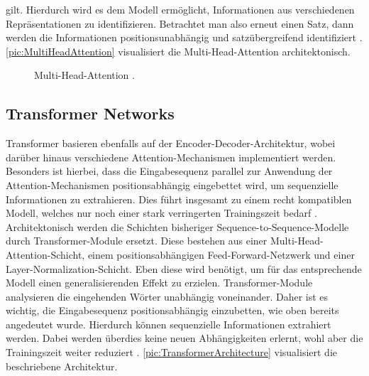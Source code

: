 \noindent
gilt. Hierdurch wird es dem Modell ermöglicht, Informationen aus verschiedenen Repräsentationen zu identifizieren. Betrachtet man also erneut einen Satz, dann werden die Informationen positionsunabhängig und satzübergreifend identifiziert \cite{VAS17}. \autoref{pic:MultiHeadAttention} visualisiert die Multi-Head-Attention architektonisch.
\newpage

\begin{figure}[h!]
  \centering
  \caption{Multi-Head-Attention \cite[S.~400]{ZHA20}.}
  \label{pic:MultiHeadAttention}
\end{figure}


\subsection{Transformer Networks}
\noindent
Transformer basieren ebenfalls auf der Encoder-Decoder-Architektur, wobei darüber hinaus verschiedene Attention-Mechanismen implementiert werden. Besonders ist hierbei, dass die Eingabesequenz parallel zur Anwendung der Attention-Mechanismen positionsabhängig eingebettet wird, um sequenzielle Informationen zu extrahieren. Dies führt insgesamt zu einem recht kompatiblen Modell, welches nur noch einer stark verringerten Trainingszeit bedarf \cite[S.~5-6]{VAS17}.\\

\noindent
Architektonisch werden die Schichten bisheriger Sequence-to-Sequence-Modelle durch Transformer-Module ersetzt. Diese bestehen aus einer Multi-Head-Attention-Schicht, einem positionsabhängigen Feed-Forward-Netzwerk und einer Layer-Normalization-Schicht. Eben diese wird benötigt, um für das entsprechende Modell einen generalisierenden Effekt zu erzielen. Transformer-Module analysieren die eingehenden Wörter unabhängig voneinander. Daher ist es wichtig, die Eingabesequenz positionsabhängig einzubetten, wie oben bereits angedeutet wurde. Hierdurch können sequenzielle Informationen extrahiert werden. Dabei werden überdies keine neuen Abhängigkeiten erlernt, wohl aber die Trainingszeit weiter reduziert \cite[S.~399-404]{ZHA20}. \autoref{pic:TransformerArchitecture} visualisiert die beschriebene Architektur.
\newpage

